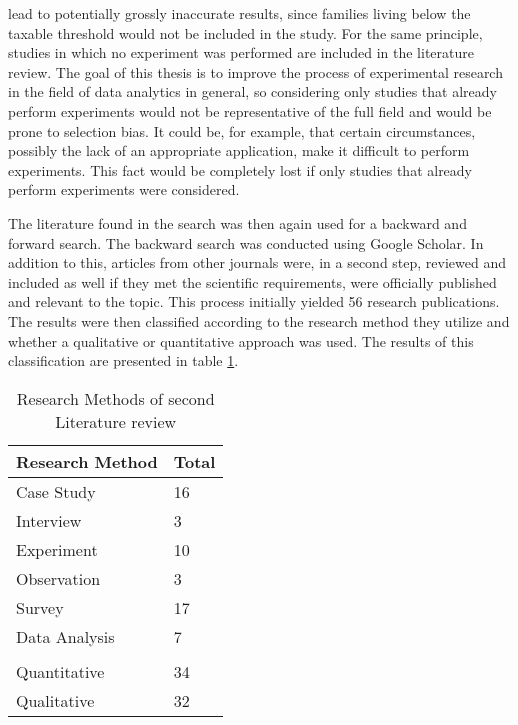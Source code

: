 lead to potentially grossly inaccurate results, since families living below the taxable threshold would not be included in the study. For the same principle, studies in which no experiment was performed are included in the literature review. The goal of this thesis is to improve the process of experimental research in the field of data analytics in general, so considering only studies that already perform experiments would not be representative of the full field and would be prone to selection bias. It could be, for example, that certain circumstances, possibly the lack of an appropriate application, make it difficult to perform experiments. This fact would be completely lost if only studies that already perform experiments were considered.

The literature found in the search was then again used for a backward and forward search. The backward search was conducted using Google Scholar. In addition to this, articles from other journals were, in a second step, reviewed and included as well if they met the scientific requirements, were officially published and relevant to the topic. This process initially yielded 56 research publications. The results were then classified according to the research method they utilize and whether a qualitative or quantitative approach was used. The results of this classification are presented in table \ref{tab:secondLiteratureSearch}.

\begin{table}[htbp]
    \centering
    \begin{tabular}{ll}
    \hline
    \multicolumn{1}{|l|}{Research Method} & \multicolumn{1}{l|}{Total} \\ \hline
    \multicolumn{1}{|l|}{Case  Study}     & \multicolumn{1}{l|}{16}    \\ \hline
    \multicolumn{1}{|l|}{Interview}       & \multicolumn{1}{l|}{3}     \\ \hline
    \multicolumn{1}{|l|}{Experiment}      & \multicolumn{1}{l|}{10}    \\ \hline
    \multicolumn{1}{|l|}{Observation}     & \multicolumn{1}{l|}{3}     \\ \hline
    \multicolumn{1}{|l|}{Survey}          & \multicolumn{1}{l|}{17}    \\ \hline
    \multicolumn{1}{|l|}{Data Analysis}   & \multicolumn{1}{l|}{7}     \\ \hline
                                          &                            \\ \hline
    \multicolumn{1}{|l|}{Quantitative}    & \multicolumn{1}{l|}{34}    \\ \hline
    \multicolumn{1}{|l|}{Qualitative}     & \multicolumn{1}{l|}{32}    \\ \hline
    \end{tabular}
    \caption[Research Methods of second Literature review]{Research Methods of second Literature review}\label{tab:secondLiteratureSearch}
    \end{table}


